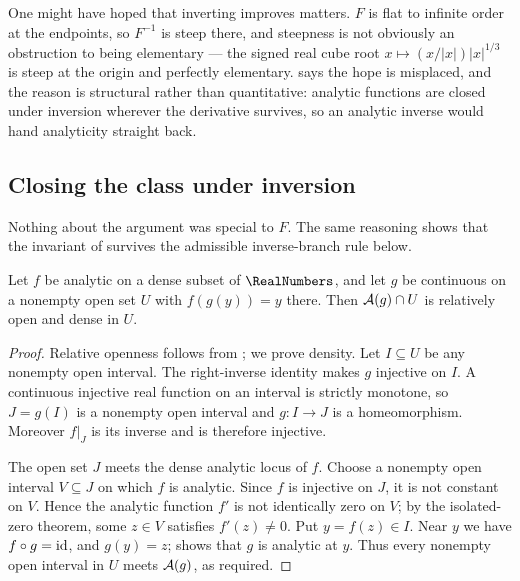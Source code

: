 \begin{boxedremark}
One might have hoped that inverting improves matters.  $F$ is flat to infinite
order at the endpoints, so $F^{-1}$ is steep there, and steepness is not
obviously an obstruction to being elementary --- the signed real cube root
$x\mapsto (x/|x|)|x|^{1/3}$ is steep at the origin and perfectly elementary.
 says the hope
is misplaced, and the reason is structural rather than quantitative: analytic
functions are closed under inversion wherever the derivative survives, so an
analytic inverse would hand analyticity straight back.
\end{boxedremark}

\subsection{Closing the class under inversion}

Nothing about the argument was special to $F$.  The same reasoning shows that
the invariant of  survives the admissible inverse-branch rule
below.

\begin{theorem}\label{ne:thm:invbranch}
Let $f$ be analytic on a dense subset of $\RealNumbers$, and let $g$ be
continuous on a nonempty open set $U$ with $f(g(y))=y$ there.  Then
$\mathcal A(g)\cap U$ is relatively open and dense in $U$.
\end{theorem}

\begin{proof}
Relative openness follows from ; we prove density.  Let
$I\subseteq U$ be any nonempty open interval.  The right-inverse identity
makes $g$ injective on $I$.  A continuous injective real function on an
interval is strictly monotone, so $J=g(I)$ is a nonempty open interval and
$g:I\to J$ is a homeomorphism.  Moreover $f|_J$ is its inverse and is
therefore injective.

The open set $J$ meets the dense analytic locus of $f$.  Choose a nonempty
open interval $V\subseteq J$ on which $f$ is analytic.  Since $f$ is
injective on $J$, it is not constant on $V$.  Hence the analytic function
$f'$ is not identically zero on $V$; by the isolated-zero theorem, some
$z\in V$ satisfies $f'(z)\ne0$.  Put $y=f(z)\in I$.  Near $y$ we have
$f\circ g=\operatorname{id}$, and $g(y)=z$;  shows that $g$ is analytic at
$y$.  Thus every nonempty open interval in $U$ meets $\mathcal A(g)$, as required.
\end{proof}

